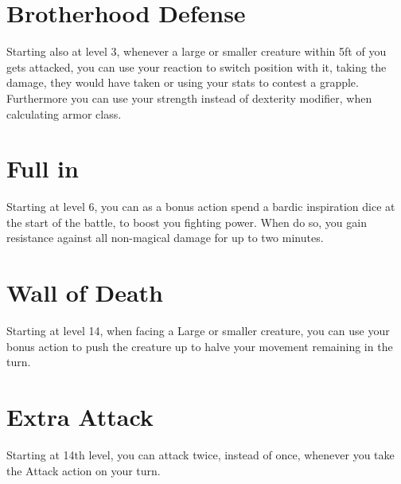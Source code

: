 \documentclass[a4paper,10pt,twoside,twocolumn, bg=full]{dndbook} %
\begin{document}
	\section{Brotherhood Defense}
		Starting also at level 3, whenever a large or smaller creature within 5ft of you gets attacked, you can use your reaction to switch position with it, taking the damage, they would have taken or using your stats to contest a grapple. Furthermore you can use your strength instead of dexterity modifier, when calculating armor class.
	\section{Full in}
		Starting at level 6, you can as a bonus action spend a bardic inspiration dice at the start of the battle, to boost you fighting power. When do so, you gain resistance against all non-magical damage for up to two minutes.
	\section{Wall of Death}
		Starting at level 14, when facing a Large or smaller creature, you can use your bonus action to push the creature up to halve your movement remaining in the turn.
	\section{Extra Attack}
		Starting at 14th level, you can attack twice, instead of once, whenever you take the Attack action on your turn.
\end{document}
